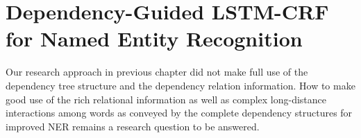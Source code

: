 
\chapter{Dependency-Guided LSTM-CRF for Named Entity Recognition} %

\label{Chapter4} %


Our research approach in previous chapter did not make full use of the dependency tree structure and the dependency relation information. 
How to make good use of the rich relational information as well as complex long-distance interactions among words as conveyed by the complete dependency structures for improved NER remains a research question to be answered.

